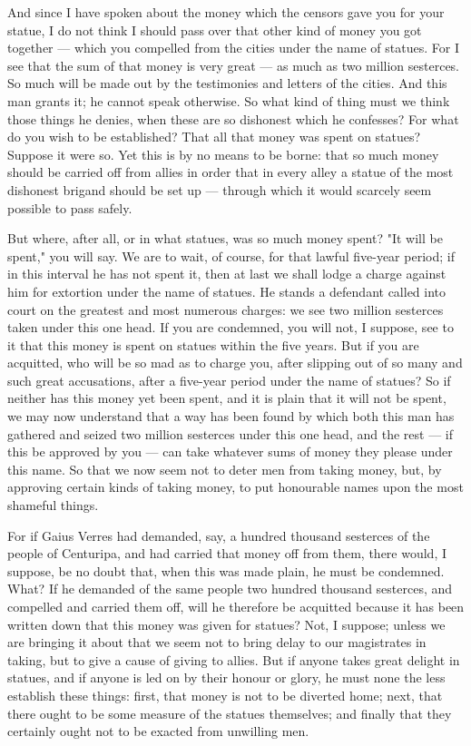  And since I have spoken about the money which the censors gave you for your statue, I do not think I should pass over that other kind of money you got together --- which you compelled from the cities under the name of statues. For I see that the sum of that money is very great --- as much as two million sesterces. So much will be made out by the testimonies and letters of the cities. And this man grants it; he cannot speak otherwise. So what kind of thing must we think those things he denies, when these are so dishonest which he confesses? For what do you wish to be established? That all that money was spent on statues? Suppose it were so. Yet this is by no means to be borne: that so much money should be carried off from allies in order that in every alley a statue of the most dishonest brigand should be set up --- through which it would scarcely seem possible to pass safely.

 But where, after all, or in what statues, was so much money spent? "It will be spent," you will say. We are to wait, of course, for that lawful five-year period; if in this interval he has not spent it, then at last we shall lodge a charge against him for extortion under the name of statues. He stands a defendant called into court on the greatest and most numerous charges: we see two million sesterces taken under this one head. If you are condemned, you will not, I suppose, see to it that this money is spent on statues within the five years. But if you are acquitted, who will be so mad as to charge you, after slipping out of so many and such great accusations, after a five-year period under the name of statues? So if neither has this money yet been spent, and it is plain that it will not be spent, we may now understand that a way has been found by which both this man has gathered and seized two million sesterces under this one head, and the rest --- if this be approved by you --- can take whatever sums of money they please under this name. So that we now seem not to deter men from taking money, but, by approving certain kinds of taking money, to put honourable names upon the most shameful things.

 For if Gaius Verres had demanded, say, a hundred thousand sesterces of the people of Centuripa, and had carried that money off from them, there would, I suppose, be no doubt that, when this was made plain, he must be condemned. What? If he demanded of the same people two hundred thousand sesterces, and compelled and carried them off, will he therefore be acquitted because it has been written down that this money was given for statues? Not, I suppose; unless we are bringing it about that we seem not to bring delay to our magistrates in taking, but to give a cause of giving to allies. But if anyone takes great delight in statues, and if anyone is led on by their honour or glory, he must none the less establish these things: first, that money is not to be diverted home; next, that there ought to be some measure of the statues themselves; and finally that they certainly ought not to be exacted from unwilling men.

